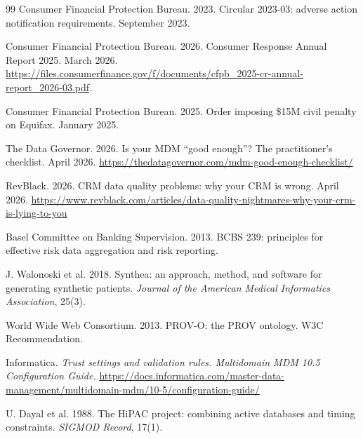 \documentclass[sigconf,nonacm]{acmart}
\begin{document}
\begin{thebibliography}{99}
Consumer Financial Protection Bureau. 2023. Circular 2023-03: adverse action notification requirements. September 2023.

Consumer Financial Protection Bureau. 2026. Consumer Response Annual Report 2025. March 2026. \url{https://files.consumerfinance.gov/f/documents/cfpb_2025-cr-annual-report_2026-03.pdf}.

Consumer Financial Protection Bureau. 2025. Order imposing \$15M civil penalty on Equifax. January 2025.

The Data Governor. 2026. Is your MDM ``good enough''? The practitioner's checklist. April 2026. \url{https://thedatagovernor.com/mdm-good-enough-checklist/}

RevBlack. 2026. CRM data quality problems: why your CRM is wrong. April 2026. \url{https://www.revblack.com/articles/data-quality-nightmares-why-your-crm-is-lying-to-you}

Basel Committee on Banking Supervision. 2013. BCBS 239: principles for effective risk data aggregation and risk reporting.

J. Walonoski et al. 2018. Synthea: an approach, method, and software for generating synthetic patients. \emph{Journal of the American Medical Informatics Association}, 25(3).

World Wide Web Consortium. 2013. PROV-O: the PROV ontology. W3C Recommendation.

Informatica. \emph{Trust settings and validation rules. Multidomain MDM 10.5 Configuration Guide.} \url{https://docs.informatica.com/master-data-management/multidomain-mdm/10-5/configuration-guide/}

U. Dayal et al. 1988. The HiPAC project: combining active databases and timing constraints. \emph{SIGMOD Record}, 17(1).

\end{thebibliography}
\end{document}
